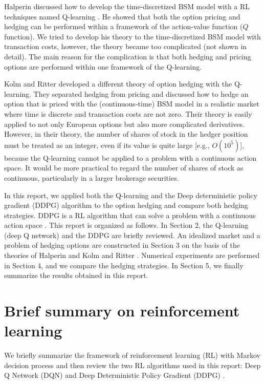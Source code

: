 \documentclass[11pt]{article}
\begin{document}
Halperin \citep{Halperin:2017, Halperin:2018} discussed how to develop the time-discretized BSM model with a RL techniques named Q-learning \citep{Watkins:Dayan:1992}. He showed that both the option pricing and hedging can be performed within a framework of the action-value function ($Q$ function). We tried to develop his theory to the time-discretized BSM model with transaction costs, however, the theory became too complicated (not shown in detail).  The main reason for the complication is that both hedging and pricing options are performed within one framework of the Q-learning.

Kolm and Ritter \citep{Kolm:Ritter:2019} developed a different theory of option hedging with the Q-learning. They separated hedging from pricing and discussed how to hedge an option that is priced with the (continuous-time) BSM model in a realistic market where time is discrete and transaction costs are not zero. Their theory is easily applied to not only European options but also more complicated derivatives. However, in their theory, the number of shares of stock in the hedger position must be treated as an integer, even if its value is quite large [e.g., $O(10^5)$], because the Q-learning cannot be applied to a problem with a continuous action space. It would be more practical to regard the number of shares of stock as continuous, particularly in a larger brokerage securities.

In this report, we applied both the Q-learning and the Deep deterministic policy gradient (DDPG) algorithm to the option hedging and compare both hedging strategies. DDPG is a RL algorithm that can solve a problem with a continuous action space \citep{Silver:etal:2014, Lillicrap:etal:2015}. This report is organized as follows. In Section 2, the Q-learning (deep Q network) and the DDPG are briefly reviewed. An idealized market and a problem of hedging options are constructed in Section 3 on the basis of the theories of Halperin \citep{Halperin:2017, Halperin:2018} and Kolm and Ritter \citep{Kolm:Ritter:2019}. Numerical experiments are performed in Section 4, and we compare the hedging strategies. In Section 5, we finally summarize the results obtained in this report.


\section{Brief summary on reinforcement learning}

We briefly summarize the framework of reinforcement learning (RL) with Markov decision process \citep{Sutton:Barto:2018} and then review the two RL algorithms used in this report: Deep Q Network (DQN) \citep{Watkins:Dayan:1992, Mnih:etal:2013} and Deep Deterministic Policy Gradient (DDPG) \citep{Silver:etal:2014, Lillicrap:etal:2015}.
\end{document}
